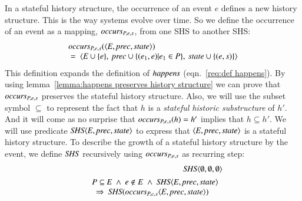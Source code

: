 \documentclass{elsarticle}
\def\id#1{\text{\em #1\/}}
\def\Events{{\mathit E}}
\begin{document}
	In a stateful history structure, the occurrence of an event $e$ defines a new history structure.
	This is the way systems evolve over time.
	So we define the occurrence of an event as a mapping, $\id{occurs}_{P,e,s}$, from one SHS to another SHS:
\begin{equation}
\begin{array}{l}
	\id{occurs}_{P,e,s}(\la \Events, \id{prec}, \id{state}\ra)\\
	\ =\ \la \Events\cup\{e\},\ \id{prec}\cup\{(e_1,e) | e_1\in P\},\ \id{state}\cup\{(e,s)\}\ra
\end{array}	
\label{eqn:def occurs}
\end{equation}
	This definition expands the definition of $\id{happens}$ (eqn.~\ref{req:def happens}).
	By using lemma~\ref{lemma:happens preserves history structure} we can prove that $\id{occurs}_{P,e,s}$ preserves
	the stateful history structure.
	Also, we will use the subset symbol $\subseteq$ to represent the fact that $h$ is a {\em stateful historic substructure} of $h'$.
	And it will come as no surprise that $\id{occurs}_{P,e,s}(h)=h'$ implies that $h\subseteq h'$.
	We will use predicate $\id{SHS}\la \Events, \id{prec}, \id{state}\ra$
	to express that $\la \Events, \id{prec}, \id{state}\ra$ is a stateful history structure.
	To describe the growth of a stateful history structure by the event,
	we define $\id{SHS}$ recursively using $\id{occurs}_{P,e,s}$ as recurring step:
\begin{eqnarray}
	&&\id{SHS}\la \emptyset, \emptyset, \emptyset\ra\\
&&\begin{array}{@{}l}
	P\subseteq\Events\ \wedge\ e\notin E\ \wedge\ \id{SHS}\la \Events, \id{prec}, \id{state}\ra\\
	\ \ \Rightarrow\ \id{SHS}(\id{occurs}_{P,e,s}\la \Events, \id{prec}, \id{state}\ra)
\end{array}
\label{req:recursive def occurs}
\end{eqnarray}
\end{document}

